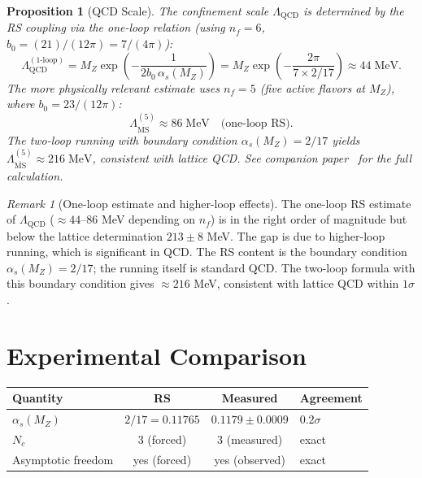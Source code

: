 \documentclass[12pt,a4paper]{article}
\newtheorem{proposition}[theorem]{Proposition}
\theoremstyle{definition}
\theoremstyle{remark}
\newtheorem{remark}[theorem]{Remark}
\begin{document}
\begin{proposition}[QCD Scale]
\label{prop:lambda}
The confinement scale $\Lambda_{\mathrm{QCD}}$ is determined by
the RS coupling via the one-loop relation (using $n_f = 6$,
$b_0 = (21)/(12\pi) = 7/(4\pi)$):
\begin{equation}
  \Lambda_{\mathrm{QCD}}^{(1\text{-loop})}
  = M_Z \exp\!\left(-\frac{1}{2 b_0\,\alpha_s(M_Z)}\right)
  = M_Z \exp\!\left(-\frac{2\pi}{7 \times 2/17}\right)
  \approx 44\;\mathrm{MeV}.
\end{equation}
The more physically relevant estimate uses $n_f = 5$
(five active flavors at $M_Z$), where $b_0 = 23/(12\pi)$:
\begin{equation}
  \Lambda_{\overline{\mathrm{MS}}}^{(5)} \approx 86\;\mathrm{MeV}
  \quad\text{(one-loop RS)}.
\end{equation}
The two-loop running with boundary condition $\alpha_s(M_Z) = 2/17$
yields $\Lambda_{\overline{\mathrm{MS}}}^{(5)} \approx 216\;\mathrm{MeV}$,
consistent with lattice QCD.  See companion paper~\cite{RS_Scale}
for the full calculation.
\end{proposition}

\begin{remark}[One-loop estimate and higher-loop effects]
The one-loop RS estimate of $\Lambda_{\mathrm{QCD}}$ ($\approx 44$--$86$
MeV depending on $n_f$) is in the right order of magnitude but below
the lattice determination $213 \pm 8$ MeV.  The gap is due to
higher-loop running, which is significant in QCD.  The RS content is
the boundary condition $\alpha_s(M_Z) = 2/17$; the running itself is
standard QCD.  The two-loop formula with this boundary condition
gives $\approx 216$ MeV, consistent with lattice QCD within $1\sigma$.
\end{remark}

\section{Experimental Comparison}
\label{sec:comparison}

\begin{center}
\renewcommand{\arraystretch}{1.3}
\begin{tabular}{lccl}
\toprule
\textbf{Quantity} & \textbf{RS} & \textbf{Measured}
& \textbf{Agreement} \\
\midrule
$\alpha_s(M_Z)$ & $2/17 = 0.11765$ &
  $0.1179 \pm 0.0009$ & $0.2\sigma$ \\
$N_c$ & 3 (forced) & 3 (measured) & exact \\
Asymptotic freedom & yes (forced) & yes (observed) & exact \\
\bottomrule
\end{tabular}
\end{center}
\end{document}
